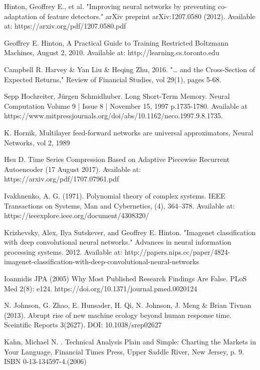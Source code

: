 \documentclass[a4paper,latin]{paper}
\begin{document}
\begin{thebibliography}{bibliography}
Hinton, Geoffrey E., et al. "Improving neural networks by preventing co-adaptation of feature detectors." arXiv preprint arXiv:1207.0580 (2012).
Available at: https://arxiv.org/pdf/1207.0580.pdf

Geoffrey E. Hinton, A Practical Guide to Training Restricted Boltzmann Machines, August 2, 2010. Available at: http://learning.cs.toronto.edu

Campbell R. Harvey \& Yan Liu \& Heqing Zhu, 2016. "… and the Cross-Section of Expected Returns," Review of Financial Studies, vol 29(1), pages 5-68.

Sepp Hochreiter,  Jürgen Schmidhuber. Long Short-Term Memory. Neural Computation Volume 9 | Issue 8 | November 15, 1997  
p.1735-1780. Available at https://www.mitpressjournals.org/doi/abs/10.1162/neco.1997.9.8.1735.

K. Hornik, Multilayer feed-forward networks are universal approximators, Neural Networks, vol 2, 1989

Hsu D. Time Series Compression Based on Adaptive Piecewise
Recurrent Autoencoder (17 August 2017). Available at: https://arxiv.org/pdf/1707.07961.pdf

Ivakhnenko, A. G. (1971). Polynomial theory of complex systems. IEEE Transactions
on Systems, Man and Cybernetics, (4), 364–378. Available at: https://ieeexplore.ieee.org/document/4308320/

Krizhevsky, Alex, Ilya Sutskever, and Geoffrey E. Hinton. "Imagenet classification with deep convolutional neural networks." Advances in neural information processing systems. 2012.
Available at: http://papers.nips.cc/paper/4824-imagenet-classification-with-deep-convolutional-neural-networks

Ioannidis JPA (2005) Why Most Published Research Findings Are False. PLoS Med 2(8): e124. https://doi.org/10.1371/journal.pmed.0020124

N. Johnson, G. Zhao, E. Hunsader, H. Qi, N. Johnson, J. Meng \& Brian Tivnan (2013). Abrupt rise of new machine ecology beyond human response time. Sceintific Reports 3(2627). DOI: 10.1038/srep02627

Kahn, Michael N. . Technical Analysis Plain and Simple: Charting the Markets in Your Language, Financial Times Press, Upper Saddle River, New Jersey, p. 9. ISBN 0-13-134597-4.(2006)


\end{thebibliography}
\end{document}
